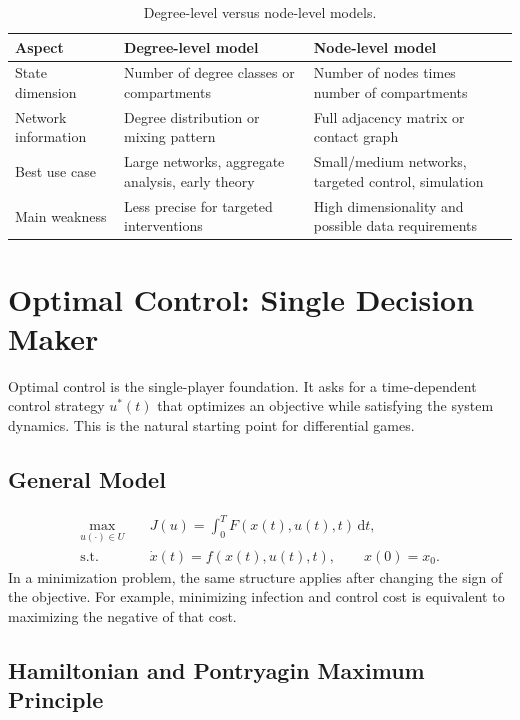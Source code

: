 \documentclass[11pt,a4paper]{article}
\newcommand{\dd}{\,\mathrm{d}}
\begin{document}
\begin{table}[h!]
\centering
\caption{Degree-level versus node-level models.}
\begin{tabularx}{\textwidth}{L{3.1cm}YY}
\toprule
\textbf{Aspect} & \textbf{Degree-level model} & \textbf{Node-level model} \\
\midrule
State dimension & Number of degree classes or compartments & Number of nodes times number of compartments \\
Network information & Degree distribution or mixing pattern & Full adjacency matrix or contact graph \\
Best use case & Large networks, aggregate analysis, early theory & Small/medium networks, targeted control, simulation \\
Main weakness & Less precise for targeted interventions & High dimensionality and possible data requirements \\
\bottomrule
\end{tabularx}
\end{table}

\section{Optimal Control: Single Decision Maker}

Optimal control is the single-player foundation. It asks for a time-dependent control strategy $u^*(t)$ that optimizes an objective while satisfying the system dynamics. This is the natural starting point for differential games.

\subsection{General Model}

\begin{align}
  \max_{u(\cdot)\in U} \quad & J(u)=\int_0^T F(x(t),u(t),t)\dd t, \label{eq:oc-obj}\\
  \text{s.t.}\quad & \dot{x}(t)=f(x(t),u(t),t),\qquad x(0)=x_0. \label{eq:oc-state}
\end{align}
In a minimization problem, the same structure applies after changing the sign of the objective. For example, minimizing infection and control cost is equivalent to maximizing the negative of that cost.

\subsection{Hamiltonian and Pontryagin Maximum Principle}
\end{document}
